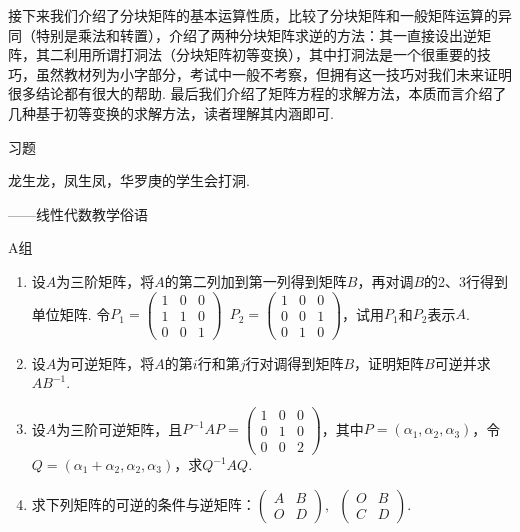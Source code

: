 接下来我们介绍了分块矩阵的基本运算性质，比较了分块矩阵和一般矩阵运算的异同（特别是乘法和转置），介绍了两种分块矩阵求逆的方法：其一直接设出逆矩阵，其二利用所谓打洞法（分块矩阵初等变换），其中打洞法是一个很重要的技巧，虽然教材列为小字部分，考试中一般不考察，但拥有这一技巧对我们未来证明很多结论都有很大的帮助. 最后我们介绍了矩阵方程的求解方法，本质而言介绍了几种基于初等变换的求解方法，读者理解其内涵即可.

\vspace{2ex}
\centerline{\heiti \Large 习题}

\vspace{2ex}
{\kaishu 龙生龙，凤生凤，华罗庚的学生会打洞.}
\begin{flushright}
    \kaishu
    ——线性代数教学俗语
\end{flushright}

\centerline{\heiti A组}
\begin{enumerate}
    \item 设$A$为三阶矩阵，将$A$的第二列加到第一列得到矩阵$B$，再对调$B$的2、3行得到单位矩阵. 令$P_1=\begin{pmatrix}1 & 0 & 0 \\ 1 & 1 & 0 \\ 0 & 0 & 1\end{pmatrix}\enspace
              P_2=\begin{pmatrix}1 & 0 & 0 \\ 0 & 0 & 1 \\ 0 & 1 & 0\end{pmatrix}$，试用$P_1$和$P_2$表示$A$.

    \item 设$A$为可逆矩阵，将$A$的第$i$行和第$j$行对调得到矩阵$B$，证明矩阵$B$可逆并求$AB^{-1}$.

    \item 设$A$为三阶可逆矩阵，且$P^{-1}AP=\begin{pmatrix}1 & 0 & 0 \\ 0 & 1 & 0 \\ 0 & 0 & 2\end{pmatrix}$，其中$P=(\alpha_1,\alpha_2,\alpha_3)$，令$Q=(\alpha_1+\alpha_2,\alpha_2,\alpha_3)$，求$Q^{-1}AQ$.

    \item 求下列矩阵的可逆的条件与逆矩阵：$\begin{pmatrix}
                  A & B \\ O & D
              \end{pmatrix},\enspace \begin{pmatrix}
                  O & B \\ C & D
              \end{pmatrix}$.
\end{enumerate}

